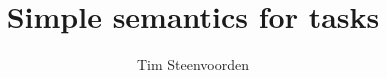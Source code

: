 \documentclass
  [a4paper
  ,justified
  ,nofonts
  ]{tufte-handout}
\begin{document}
\title{Simple semantics for tasks}
\author{Tim Steenvoorden}

\maketitle













\end{document}

